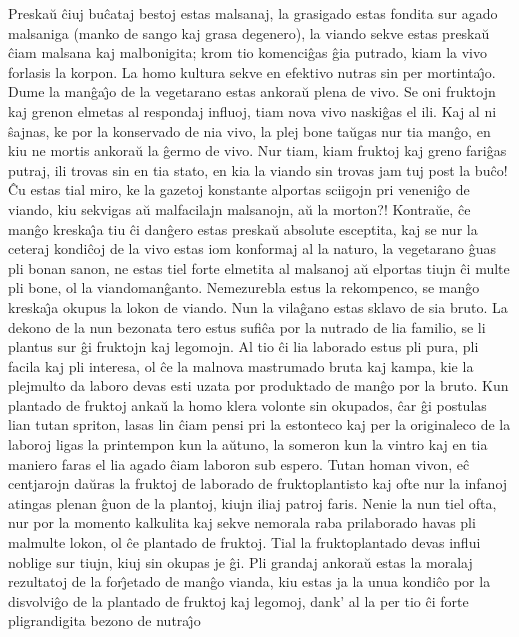Preska\u u \^ciuj bu\^cataj bestoj estas malsanaj, la grasigado
estas fondita sur agado malsaniga (manko de sango kaj grasa
degenero), la viando sekve estas preska\u u \^ciam malsana kaj
malbonigita; krom tio komenci\^gas \^gia putrado, kiam la vivo
forlasis la korpon. La homo kultura sekve en efektivo nutras sin per
mortinta\^{\j}o. Dume la man\^ga\^{\j}o de la vegetarano estas
ankora\u u plena de vivo. Se oni fruktojn kaj grenon elmetas al
respondaj influoj, tiam nova vivo naski\^gas el ili. Kaj al ni
\^sajnas, ke por la konservado de nia vivo, la plej bone ta\u ugas
nur tia man\^go, en kiu ne mortis ankora\u u la \^germo de vivo. Nur
tiam, kiam fruktoj kaj greno fari\^gas putraj, ili trovas sin en tia
stato, en kia la viando sin trovas jam tuj post la bu\^co! \^Cu
estas tial miro, ke la gazetoj konstante alportas sciigojn pri
veneni\^go de viando, kiu sekvigas a\u u malfacilajn malsanojn, a\u
u la morton?! Kontra\u ue, \^ce man\^go kreska\^{\j}a tiu \^ci
dan\^gero estas preska\u u absolute esceptita, kaj se nur la ceteraj
kondi\^coj de la vivo estas iom konformaj al la naturo, la
vegetarano \^guas pli bonan sanon, ne estas tiel forte elmetita al
malsanoj a\u u elportas tiujn \^ci multe pli bone, ol la
viandoman\^ganto. Nemezurebla estus la rekompenco, se man\^go
kreska\^{\j}a okupus la lokon de viando. Nun la vila\^gano estas
sklavo de sia bruto. La dekono de la nun bezonata tero estus
sufi\^ca por la nutrado de lia familio, se li plantus sur \^gi
fruktojn kaj legomojn. Al tio \^ci lia laborado estus pli pura, pli
facila kaj pli interesa, ol \^ce la malnova mastrumado bruta kaj
kampa, kie la plejmulto da laboro devas esti uzata por produktado de
man\^go por la bruto. Kun plantado de fruktoj anka\u u la homo klera
volonte sin okupados, \^car \^gi postulas lian tutan spriton, lasas
lin \^ciam pensi pri la estonteco kaj per la originaleco de la
laboroj ligas la printempon kun la a\u utuno, la someron kun la
vintro kaj en tia maniero faras el lia agado \^ciam laboron sub
espero. Tutan homan vivon, e\^c centjarojn da\u uras la fruktoj de
laborado de fruktoplantisto kaj ofte nur la infanoj atingas plenan
\^guon de la plantoj, kiujn iliaj patroj faris. Nenie la nun tiel
ofta, nur por la momento kalkulita kaj sekve nemorala raba
prilaborado havas pli malmulte lokon, ol \^ce plantado de fruktoj.
Tial la fruktoplantado devas influi noblige sur tiujn, kiuj sin
okupas je \^gi. Pli grandaj ankora\u u estas la moralaj rezultatoj
de la for\^{\j}etado de man\^go vianda, kiu estas ja la unua
kondi\^co por la disvolvi\^go de la plantado de fruktoj kaj legomoj,
dank' al la per tio \^ci forte pligrandigita bezono de nutra\^{\j}o
